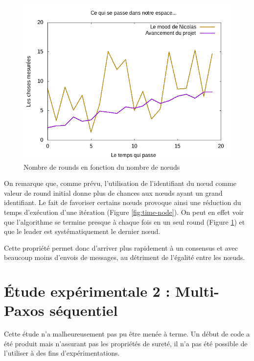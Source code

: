 \documentclass[french]{article}
\begin{document}
\begin{figure}[ht]
    \centering
    \includegraphics[width=1\textwidth]{test} %
    \caption{Nombre de rounds en fonction du nombre de nœuds}
    \label{fig:round-node}
\end{figure}

On remarque que, comme prévu, l'utilisation de l'identifiant du nœud comme valeur de round initial donne plus de chances aux nœuds ayant un grand identifiant.
Le fait de favoriser certains nœuds provoque ainsi une réduction du temps d'exécution d'une itération (Figure \ref{fig:time-node}).
On peut en effet voir que l'algorithme se termine presque à chaque fois en un seul round (Figure \ref{fig:round-node}) et que le leader est systématiquement le dernier nœud.

Cette propriété permet donc d'arriver plus rapidement à un consensus et avec beaucoup moins d'envois de messages,
au détriment de l'égalité entre les nœuds.





\section{Étude expérimentale 2 : Multi-Paxos séquentiel}

Cette étude n'a malheureusement pas pu être menée à terme.
Un début de code a été produit mais n'assurant pas les propriétés de sureté, il n'a pas été possible de l'utiliser à des fins d'expérimentations.
\end{document}
